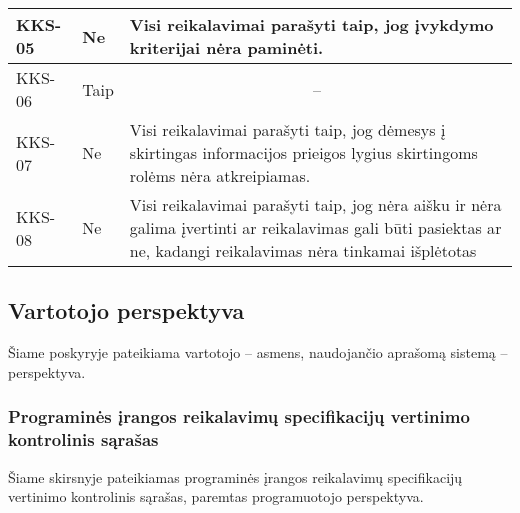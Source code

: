 \documentclass{VUMIFPSkursinis}
\begin{document}
\begin{center}
\begin{longtable}{|C{2cm}|L{2.5cm}|L{10cm}|}
		KKS-05                                          &
		Ne                                              &
		Visi reikalavimai parašyti taip, jog įvykdymo kriterijai nėra paminėti.
		\\ \hline

		KKS-06                                          &
		Taip                                              &
		\\ \hline

		KKS-07                                          &
		Ne                                              &
		Visi reikalavimai parašyti taip, jog dėmesys į skirtingas informacijos prieigos lygius skirtingoms rolėms nėra atkreipiamas.
		\\ \hline

		KKS-08                                          &
		Ne                                              &
		Visi reikalavimai parašyti taip, jog nėra aišku ir nėra galima įvertinti ar reikalavimas gali būti pasiektas ar ne, kadangi reikalavimas nėra tinkamai išplėtotas
		\\ \hline
\end{longtable}
\end{center}



\subsection{Vartotojo perspektyva}

Šiame poskyryje pateikiama vartotojo -- asmens, naudojančio aprašomą sistemą -- perspektyva.

\subsubsection{Programinės įrangos reikalavimų specifikacijų vertinimo kontrolinis sąrašas}

Šiame skirsnyje pateikiamas programinės įrangos reikalavimų specifikacijų vertinimo kontrolinis sąrašas,
paremtas programuotojo perspektyva.
\end{document}
